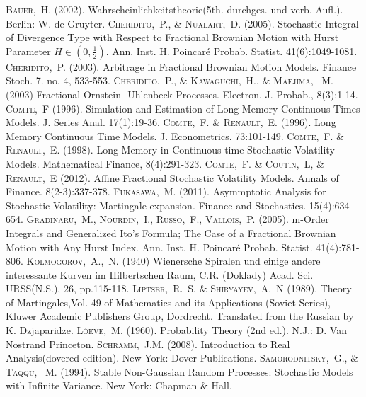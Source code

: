 \documentclass[a4paper, twoside, 11pt]{article}
\theoremstyle{definition}
\begin{document}
\newpage



\begin{thebibliography}{99}
	 \textsc{Bauer,~H.} (2002). Wahrscheinlichkeitstheorie(5th. durchges. und verb. Aufl.). Berlin: W. de Gruyter.
	 \textsc{Cheridito,~P., \& Nualart,~D.} (2005). Stochastic Integral of Divergence Type with Respect to Fractional Brownian Motion with Hurst Parameter $H \in(0, \frac{1}{2})$. Ann. Inst. H. Poincar\'e Probab. Statist. 41(6):1049-1081. 
	 \textsc{Cheridito,~P.} (2003). Arbitrage in Fractional Brownian Motion Models. Finance Stoch. 7. no. 4, 533-553.
	 \textsc{Cheridito,~P., \& Kawaguchi,~H., \& Maejima, ~M.} (2003) Fractional Ornstein- Uhlenbeck Processes. Electron. J. Probab., 8(3):1-14.
	 \textsc{Comte,~F} (1996). Simulation and Estimation of Long Memory Continuous Times Models. J. Series Anal. 17(1):19-36.
	 \textsc{Comte,~F. \& Renault,~E.} (1996). Long Memory Continuous Time Models. J. Econometrics. 73:101-149.
	 \textsc{Comte,~F. \& Renault,~E.} (1998). Long Memory in Continuous-time Stochastic Volatility Models. Mathematical Finance, 8(4):291-323.
	   \textsc{Comte,~F. \& Coutin,~L, \& Renault,~E} (2012). Affine Fractional Stochastic Volatility Models. Annals of Finance. 8(2-3):337-378.
	   \textsc{Fukasawa,~M.} (2011). Asymmptotic Analysis for Stochastic Volatility: Martingale expansion. Finance and Stochastics. 15(4):634-654.
	 \textsc{Gradinaru,~M., Nourdin,~I., Russo,~F., Vallois,~P.} (2005). m-Order Integrals and Generalized Ito's Formula; The Case of a Fractional Brownian Motion with Any Hurst Index. Ann. Inst. H. Poincar\'e Probab. Statist. 41(4):781-806. 
	 \textsc{Kolmogorov,~A.,~N.} (1940) Wienersche Spiralen und einige andere interessante Kurven im Hilbertschen Raum, C.R. (Doklady) Acad. Sci. URSS(N.S.), 26, pp.115-118.
	 \textsc{Liptser,~R.~S. \& Shiryayev,~A.~N} (1989). Theory of Martingales,Vol. 49 of Mathematics and its Applications (Soviet Series), Kluwer Academic Publishers Group, Dordrecht. Translated from the Russian by K. Dzjaparidze.
	 \textsc{L\`oeve,~M.} (1960). Probability Theory (2nd ed.). N.J.: D. Van Nostrand Princeton.
	 \textsc{Schramm,~J.M.} (2008). Introduction to Real Analysis(dovered edition). New York: Dover Publications.
	 \textsc{Samorodnitsky,~G., \& Taqqu, ~M.} (1994). Stable Non-Gaussian Random Processes: Stochastic Models with Infinite Variance. New York: Chapman \& Hall.

\end{thebibliography}
\end{document}
